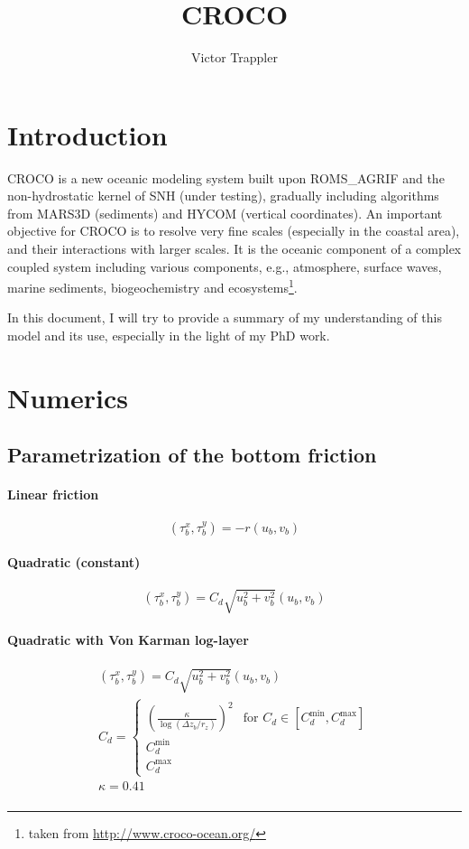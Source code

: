 \documentclass{article}
\author{Victor Trappler}
\title{CROCO}
\begin{document}
\maketitle

\section*{Introduction}

CROCO is a new oceanic modeling system built upon ROMS\_AGRIF and the non-hydrostatic kernel of SNH (under testing), gradually including algorithms from MARS3D (sediments)  and HYCOM (vertical coordinates). An important objective for CROCO is to resolve very fine scales (especially in the coastal area), and their interactions with larger scales. It is the oceanic component of a complex coupled system including various components, e.g., atmosphere, surface waves, marine sediments, biogeochemistry and ecosystems\footnote{taken from \url{http://www.croco-ocean.org/}}.

In this document, I will try to provide a summary of my understanding of this model and its use, especially in the light of my PhD work.
\section{Numerics}
\subsection{Parametrization of the bottom friction}
\paragraph{Linear friction}
\begin{equation}
  \label{eq:linear_friction}
  (\tau_b^x, \tau_b^y) = -r (u_b, v_b)
\end{equation}
\paragraph{Quadratic (constant)}
\begin{equation}
  \label{eq:quadratic_friction_constant}
  (\tau_b^x, \tau_b^y) = C_d \sqrt{u_b^2 + v_b^2}(u_b, v_b)
\end{equation}
\paragraph{Quadratic with Von Karman log-layer}
\begin{align}
  \label{eq:quadratic_friction_vonkarman}
  (\tau_b^x, \tau_b^y) = C_d \sqrt{u_b^2 + v_b^2}(u_b, v_b) \\  
  C_d = \left\{\begin{array}{ll}
                 {\left(\frac{\kappa}{\log({\Delta z_b}/{r_z})}\right)}^2 & \text{for } C_d \in [C_d^{\min}, C_d^{\max}] \\
                 C_d^{\min} & \\
                 C_d^{\max}
       \end{array}
  \right. \\
  \kappa=0.41 \\  
\end{align}
\end{document}
